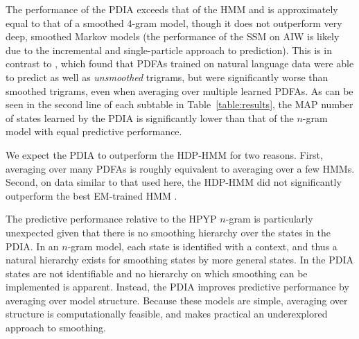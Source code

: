 
The performance of the PDIA exceeds that of the HMM and is approximately equal to that of a smoothed 4-gram model, though it does not outperform very deep, smoothed Markov models (the performance of the SSM on AIW is likely due to the incremental and single-particle approach to prediction).  This is in contrast to \cite{Thollard2001}, which found that PDFAs trained on natural language data were able to predict as well as {\em unsmoothed} trigrams, but were significantly worse than smoothed trigrams, even when averaging over multiple learned PDFAs.  As can be seen in the second line of each subtable in Table~\ref{table:results}, the MAP number of states learned by the PDIA is significantly lower than that of the $n$-gram model with equal predictive performance.

We expect the PDIA to outperform the HDP-HMM for two reasons.  First, averaging over many PDFAs is roughly equivalent to averaging over a few HMMs.  Second, on data similar to that used here, the HDP-HMM did not significantly outperform the best EM-trained HMM \cite{Teh2006b}.

The predictive performance relative to the HPYP $n$-gram is particularly unexpected given that there is no smoothing hierarchy over the states in the PDIA.  In an $n$-gram model, each state is identified with a context, and thus a natural hierarchy exists for smoothing states by more general states.  In the PDIA states are not identifiable and no hierarchy on which smoothing can be implemented is apparent.  Instead, the PDIA improves predictive performance by averaging over model structure.  Because these models are simple, averaging over structure is computationally feasible, and makes practical an underexplored approach to smoothing.



